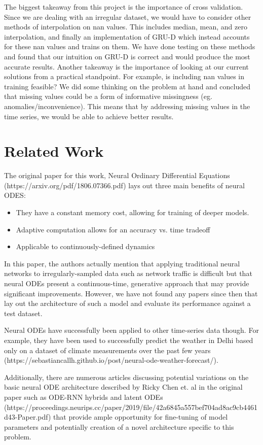 \documentclass{article} %
\begin{document}
The biggest takeaway from this project is the importance of cross validation. Since we are dealing with an irregular dataset, we would have to consider other methods of interpolation on nan values. This includes median, mean, and zero interpolation, and finally an implementation of GRU-D which instead accounts for these nan values and trains on them. We have done testing on these methods and found that our intuition on GRU-D is correct and would produce the most accurate results. Another takeaway is the importance of looking at our current solutions from a practical standpoint. For example, is including nan values in training feasible? We did some thinking on the problem at hand and concluded that missing values could be a form of informative missingness (eg. anomalies/inconvenience). This means that by addressing missing values in the time series, we would be able to achieve better results.

\section{Related Work}
The original paper for this work, Neural Ordinary Differential Equations (https://arxiv.org/pdf/1806.07366.pdf) lays out three main benefits of neural ODES:
\begin{itemize}
  \item They have a constant memory cost, allowing for training of deeper models.
  \item Adaptive computation allows for an accuracy vs. time tradeoff
  \item Applicable to continuously-defined dynamics
\end{itemize}

In this paper, the authors actually mention that applying traditional neural networks to irregularly-sampled data such as network traffic is difficult but that neural ODEs present a continuous-time, generative approach that may provide significant improvements. However, we have not found any papers since then that lay out the architecture of such a model and evaluate its performance against a test dataset.

Neural ODEs have successfully been applied to other time-series data though. For example, they have been used to successfully predict the weather in Delhi based only on a dataset of climate measurements over the past few years (https://sebastiancallh.github.io/post/neural-ode-weather-forecast/).

Additionally, there are numerous articles discussing potential variations on the basic neural ODE architecture described by Ricky Chen et. al in the original paper such as ODE-RNN hybrids and latent ODEs (https://proceedings.neurips.cc/paper/2019/file/42a6845a557bef704ad8ac9cb4461d43-Paper.pdf) that provide ample opportunity for fine-tuning of model parameters and potentially creation of a novel architecture specific to this problem.
\end{document}
